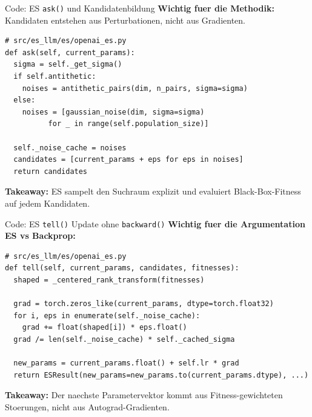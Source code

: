 \documentclass[aspectratio=169,11pt]{beamer}
\begin{document}
\begin{frame}[fragile]{Code: ES \texttt{ask()} und Kandidatenbildung}
\textbf{Wichtig fuer die Methodik:} Kandidaten entstehen aus Perturbationen, nicht aus Gradienten.

\begin{lstlisting}[style=pycode]
# src/es_llm/es/openai_es.py
def ask(self, current_params):
  sigma = self._get_sigma()
  if self.antithetic:
    noises = antithetic_pairs(dim, n_pairs, sigma=sigma)
  else:
    noises = [gaussian_noise(dim, sigma=sigma)
          for _ in range(self.population_size)]

  self._noise_cache = noises
  candidates = [current_params + eps for eps in noises]
  return candidates
\end{lstlisting}

\textbf{Takeaway:} ES sampelt den Suchraum explizit und evaluiert Black-Box-Fitness auf jedem Kandidaten.
\end{frame}

\begin{frame}[fragile]{Code: ES \texttt{tell()} Update ohne \texttt{backward()}}
\textbf{Wichtig fuer die Argumentation ES vs Backprop:}

\begin{lstlisting}[style=pycode]
# src/es_llm/es/openai_es.py
def tell(self, current_params, candidates, fitnesses):
  shaped = _centered_rank_transform(fitnesses)

  grad = torch.zeros_like(current_params, dtype=torch.float32)
  for i, eps in enumerate(self._noise_cache):
    grad += float(shaped[i]) * eps.float()
  grad /= len(self._noise_cache) * self._cached_sigma

  new_params = current_params.float() + self.lr * grad
  return ESResult(new_params=new_params.to(current_params.dtype), ...)
\end{lstlisting}

\textbf{Takeaway:} Der naechste Parametervektor kommt aus Fitness-gewichteten Stoerungen, nicht aus Autograd-Gradienten.
\end{frame}
\end{document}
